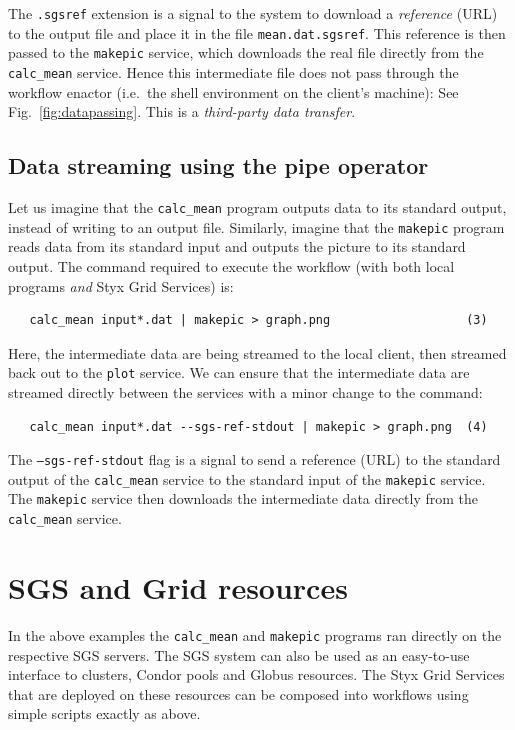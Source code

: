 \documentclass[a4paper]{article}
\begin{document}
The \texttt{.sgsref} extension is a signal to the system to download a \textit{reference\/} (URL) to the output file and place it in the file \texttt{mean.dat.sgsref}.  This reference is then passed to the \texttt{makepic} service, which downloads the real file directly from the \texttt{calc\_mean} service.  Hence this intermediate file does not pass through the workflow enactor (i.e.\ the shell environment on the client's machine): See Fig.~\ref{fig:datapassing}.  This is a \textit{third-party data transfer}.

\subsection{Data streaming using the pipe operator}\label{sec:pipes}
Let us imagine that the \texttt{calc\_mean} program outputs data to its standard output, instead of writing to an output file.  Similarly, imagine that the \texttt{makepic} program reads data from its standard input and outputs the picture to its standard output.  The command required to execute the workflow (with both local programs \textit{and\/} Styx Grid Services) is:

\begin{verbatim}
   calc_mean input*.dat | makepic > graph.png                   (3)
\end{verbatim}

Here, the intermediate data are being streamed to the local client, then streamed back out to the \texttt{plot} service.  We can ensure that the intermediate data are streamed directly between the services with a minor change to the command:

\begin{verbatim}
   calc_mean input*.dat --sgs-ref-stdout | makepic > graph.png  (4)
\end{verbatim}

The \texttt{--sgs-ref-stdout} flag is a signal to send a reference (URL) to the standard output of the \texttt{calc\_mean} service to the standard input of the \texttt{makepic} service.  The \texttt{makepic} service then downloads the intermediate data directly from the \texttt{calc\_mean} service.


\section{SGS and Grid resources}

In the above examples the \texttt{calc\_mean} and \texttt{makepic} programs ran directly on the respective SGS servers.  The SGS system can also be used as an easy-to-use interface to clusters, Condor pools and Globus resources.  The Styx Grid Services that are deployed on these resources can be composed into workflows using simple scripts exactly as above.
\end{document}
